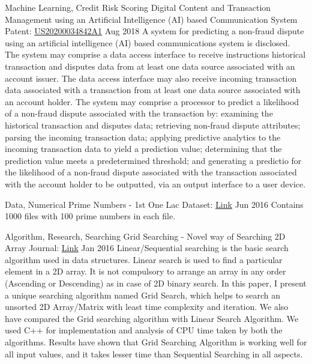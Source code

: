 \begin{cventries}
    \vspace{3mm}
    \cventry
    {Machine Learning, Credit Risk Scoring}
    {Digital Content and Transaction Management using an Artificial Intelligence (AI) based Communication System}
    {Patent: \href{https://patents.google.com/patent/US20200034842A1/en}{US20200034842A1}}
    {Aug 2018}
    {A system for predicting a non-fraud dispute using an artificial intelligence (AI) based communications system is disclosed. The system may comprise a data access interface to receive instructions historical transaction and disputes data from at least one data source associated with an account issuer. The data access interface may also receive incoming transaction data associated with a transaction from at least one data source associated with an account holder. The system may comprise a processor to predict a likelihood of a non-fraud dispute associated with the transaction by: examining the historical transaction and disputes data; retrieving non-fraud dispute attributes; parsing the incoming transaction data; applying predictive analytics to the incoming transaction data to yield a prediction value; determining that the prediction value meets a predetermined threshold; and generating a predictio for the likelihood of a non-fraud dispute associated with the transaction associated with the account holder to be outputted, via an output interface to a user device.}

    \cventry
    {Data, Numerical}
    {Prime Numbers - 1st One Lac}
    {Dataset: \href{https://github.com/rehanguha/Generating-Prime-Numbers}{\faLink Link}}
    {Jun 2016}
    {Contains 1000 files with 100 prime numbers in each file.}

    \cventry
    {Algorithm, Research, Searching}
    {Grid Searching - Novel way of Searching 2D Array}
    {Journal: \href{https://www.ijcat.com/show.php?vol=volume5&issu=issue1&uid=ijcatr05011005}{\faLink Link}}
    {Jan 2016}
    {Linear/Sequential searching is the basic search algorithm used in data structures. Linear search is used to find a particular element in a
    2D array. It is not compulsory to arrange an array in any order (Ascending or Descending) as in case of 2D binary search. In this paper, I
    present a unique searching algorithm named Grid Search, which helps to search an unsorted 2D Array/Matrix with least time
    complexity and iteration. We also have compared the Grid searching algorithm with Linear Search Algorithm. We used C++ for
    implementation and analysis of CPU time taken by both the algorithms. Results have shown that Grid Searching Algorithm is working
    well for all input values, and it takes lesser time than Sequential Searching in all aspects.}


\end{cventries}
